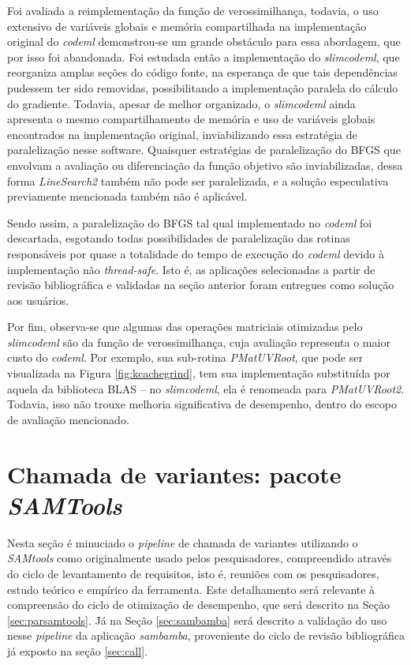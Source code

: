 \documentclass[cic,tc]{iiufrgs}
\begin{document}
Foi avaliada a reimplementação da função de verossimilhança, todavia, o
uso extensivo de variáveis globais e memória compartilhada na implementação
original do \textit{codeml} demonstrou-se um grande obstáculo para essa abordagem, que
por isso foi abandonada. Foi estudada então a implementação do \textit{slimcodeml}, que
reorganiza amplas seções do código fonte, na esperança de que tais
dependências pudessem ter sido removidas, possibilitando a implementação
paralela do cálculo do gradiente. Todavia, apesar de melhor organizado, o
\textit{slimcodeml} ainda apresenta o mesmo compartilhamento de memória e uso de
variáveis globais encontrados na implementação original, inviabilizando essa
estratégia de paralelização nesse software. Quaisquer estratégias de
paralelização do BFGS que envolvam a avaliação ou diferenciação da função
objetivo são inviabilizadas, dessa forma \textit{LineSearch2} também não pode
ser paralelizada, e a solução especulativa previamente mencionada também não é
aplicável.

Sendo assim, a paralelização do BFGS tal qual implementado no \textit{codeml} foi
descartada, esgotando todas possibilidades de paralelização das rotinas
responsáveis por quase a totalidade do tempo de execução do \textit{codeml} devido à
implementação não \textit{thread-safe}. Isto é, as aplicações selecionadas a
partir de revisão bibliográfica e validadas na seção anterior foram entregues
como solução aos usuários.

Por fim, observa-se que algumas das operações matriciais otimizadas pelo
\textit{slimcodeml} são da função de verossimilhança, cuja avaliação representa
o maior custo do \textit{codeml}. Por exemplo, sua sub-rotina
\textit{PMatUVRoot}, que pode ser visualizada na Figura \ref{fig:kcachegrind},
tem sua implementação substituída por aquela da biblioteca BLAS -- no
\textit{slimcodeml}, ela é renomeada para \textit{PMatUVRoot2}. Todavia, isso
não trouxe melhoria significativa de desempenho, dentro do escopo de avaliação
mencionado.

\section{Chamada de variantes: pacote \textit{SAMTools}}
\label{sec:SAMtools}

Nesta seção é minuciado o \textit{pipeline} de chamada de variantes utilizando
o \textit{SAMtools} como originalmente usado pelos pesquisadores, compreendido
através do ciclo de levantamento de requisitos, isto é, reuniões com os
pesquisadores, estudo teórico e empírico da ferramenta. Este detalhamento será
relevante à compreensão do ciclo de otimização de desempenho, que será descrito
na Seção \ref{sec:parsamtools}.  Já na Seção \ref{sec:sambamba} será descrito a
validação do uso nesse \textit{pipeline} da aplicação \textit{sambamba},
proveniente do ciclo de revisão bibliográfica já exposto na seção
\ref{sec:call}.
\end{document}

